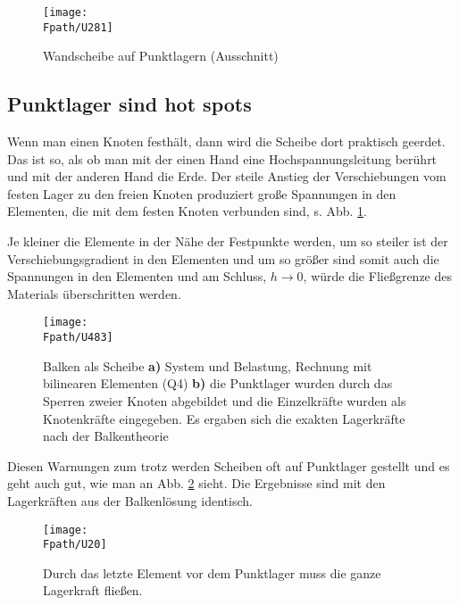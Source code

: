 {%
\begin{figure}
\centering
\if {} \sidecaption[t] \fi
{\texttt{[image: \\Fpath/U281]}}
\caption{Wandscheibe auf Punktlagern (Ausschnitt)}  %
\label{U281}%
\end{figure}%

{\textcolor{sectionTitleBlue}{\subsection{Punktlager sind hot spots}}}\label{Punktlager}
Wenn man einen Knoten festh\"{a}lt, dann wird die Scheibe dort praktisch \glq geerdet\grq. Das ist so, als ob man mit der einen Hand eine Hochspannungsleitung ber\"{u}hrt und mit der anderen Hand die Erde. Der steile Anstieg der Verschiebungen vom festen Lager zu den freien Knoten produziert gro{\ss}e Spannungen in den Elementen, die mit dem festen Knoten verbunden sind, s. Abb. \ref{U281}.

Je kleiner die Elemente in der N\"{a}he der Festpunkte werden, um so steiler ist der Verschiebungsgradient in den Elementen und um so gr\"{o}{\ss}er sind somit auch die Spannungen in den Elementen und am Schluss, $h \to 0$, w\"{u}rde die Flie{\ss}grenze des Materials \"{u}berschritten werden.

\begin{figure}[tbp] \centering
\if {} \sidecaption \fi
\texttt{[image: \\Fpath/U483]}
\caption{Balken als Scheibe {\bf a)} System und Belastung, Rechnung mit bilinearen
Elementen (Q4) {\bf b)} die Punktlager wurden durch das Sperren zweier Knoten abgebildet
und die Einzelkr\"{a}fte wurden als Knotenkr\"{a}fte eingegeben. Es ergaben sich die exakten
Lagerkr\"{a}fte nach der Balkentheorie} \label{U483}
\end{figure}%

Diesen Warnungen zum trotz werden Scheiben oft auf Punktlager gestellt und es geht auch gut, wie man an Abb. \ref{U483} sieht. Die Ergebnisse sind mit den Lagerkr\"{a}ften aus der Balkenl\"{o}sung identisch.
\begin{figure}
\centering
\if {} \sidecaption[t] \fi
{\texttt{[image: \\Fpath/U20]}}
\caption{Durch das letzte Element vor dem Punktlager muss die ganze Lagerkraft flie{\ss}en.}
\label{U20}%
\end{figure}%

}
